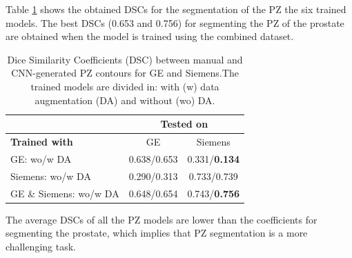 Table \ref{tab:res_pz} shows the obtained DSCs for the segmentation of the PZ the six trained models.  The best DSCs (0.653 and 0.756) for segmenting the PZ of the prostate are obtained when the model is trained using the combined dataset.  

\begin{table}[h]
    \centering
    \begin{tabular}{|l|c|c|}
         \hline
          & \multicolumn{2}{c|}{ \textbf{Tested on} } \\
        \hline
         \textbf{Trained with} &  GE & Siemens\\
         \hline
         GE: wo/w DA & 0.638/0.653& 0.331/\textbf{0.134} \\
         \hline
         Siemens: wo/w DA & 0.290/0.313 & 0.733/0.739\\
         \hline
         GE \& Siemens: wo/w DA & 0.648/0.654 & 0.743/\textbf{0.756}\\
         \hline
    \end{tabular}
    \caption{Dice Similarity Coefficients (DSC) between manual and CNN-generated PZ contours for GE and Siemens.The trained models are divided in: with (w) data augmentation (DA) and without (wo) DA.}
    \label{tab:res_pz}
\end{table}

The average DSCs of all the PZ models are lower than the coefficients for segmenting the prostate, which implies that PZ segmentation is a more challenging task.

